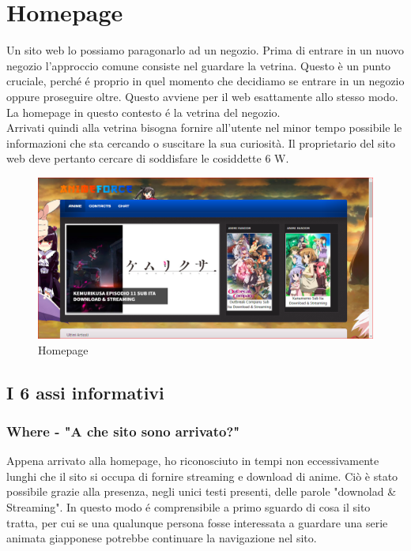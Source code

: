 \section{Homepage} \label{Homepage}
Un sito web lo possiamo paragonarlo ad un negozio. Prima di entrare in un nuovo negozio l’approccio comune consiste nel guardare la vetrina. Questo è un punto cruciale, perché é proprio in quel momento che decidiamo se entrare in un negozio oppure proseguire oltre. Questo avviene per il web esattamente allo stesso modo. La homepage in questo contesto é la vetrina del negozio. \\
Arrivati quindi alla vetrina bisogna fornire all'utente nel minor tempo possibile le informazioni che sta cercando o  suscitare la sua curiosità. Il proprietario del sito web deve pertanto cercare di soddisfare le cosiddette 6 W. 

\begin{figure}[H]
	\centering 
	\includegraphics[width=1\textwidth]{img/homepage01.png}
	\caption{Homepage} 
	\label{img1} 
\end{figure}

\subsection{I 6 assi informativi} \label{Assi informativi}

\subsubsection{Where - "A che sito sono arrivato?"} \label{HWhere}
Appena arrivato alla homepage, ho riconosciuto in tempi non eccessivamente lunghi che il sito si occupa di fornire streaming e download di anime. Ciò è stato possibile grazie alla presenza, negli unici testi presenti, delle parole "downolad \& Streaming". In questo modo é comprensibile a primo sguardo di cosa il sito tratta, per cui se una qualunque persona fosse interessata a guardare una serie animata giapponese potrebbe continuare la navigazione nel sito.


